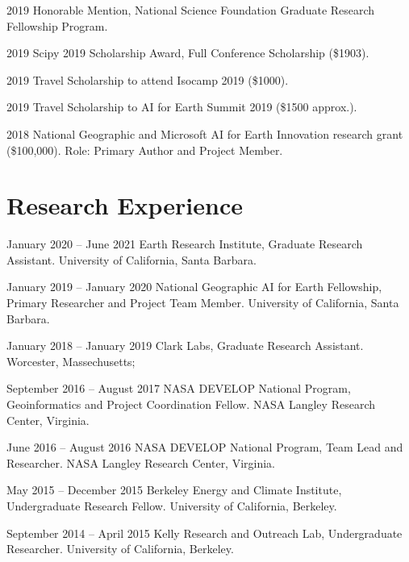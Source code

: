 \documentclass[12pt,letterpaper]{report}
\begin{document}
	\begin{tablist}
		
        \item[2019] \tab Honorable Mention, National Science Foundation Graduate Research Fellowship Program.
        \item[2019] \tab Scipy 2019 Scholarship Award, Full Conference Scholarship (\$1903).
        \item[2019] \tab Travel Scholarship to attend Isocamp 2019 (\$1000).
        \item[2019] \tab Travel Scholarship to AI for Earth Summit 2019 (\$1500 approx.).
		\item[2018] \tab National Geographic and Microsoft AI for Earth Innovation research grant (\$100,000). Role: Primary Author and Project Member.
		
	\end{tablist}
	


    \section*{Research Experience}

    \begin{tablist}
    
        \item[January 2020 -- June 2021] \tab Earth Research Institute, Graduate Research Assistant. University of California, Santa Barbara.

        \item[January 2019 -- January 2020] \tab National Geographic AI for Earth Fellowship, Primary Researcher and Project Team Member. University of California, Santa Barbara.

        \item[January 2018 -- January 2019] \tab Clark Labs, Graduate Research Assistant. Worcester, Massechusetts; 

        \item[September 2016 -- August 2017] \tab NASA DEVELOP National Program, Geoinformatics and Project Coordination Fellow. NASA Langley Research Center, Virginia.

        \item[June 2016 -- August 2016] \tab NASA DEVELOP National Program, Team Lead and Researcher. NASA Langley Research Center, Virginia.

        \item[May 2015 -- December 2015] \tab Berkeley Energy and Climate Institute, Undergraduate Research Fellow. University of California, Berkeley.

        \item[September 2014 -- April 2015] \tab Kelly Research and Outreach Lab, Undergraduate Researcher. University of California, Berkeley.

    \end{tablist}
\end{document}
